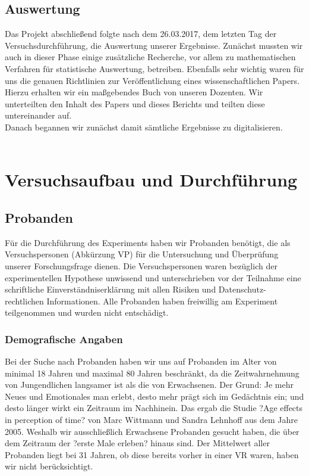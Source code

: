 \documentclass{Bericht}
\begin{document}
	\subsection{Auswertung} %
	
		Das Projekt abschließend folgte nach dem 26.03.2017, dem letzten Tag der Versuchsdurchführung, die Auswertung unserer Ergebnisse.
		Zunächst mussten wir auch in dieser Phase einige zusätzliche Recherche, vor allem zu mathematischen Verfahren für statistische Auswertung, betreiben. Ebenfalls sehr wichtig waren für uns die genauen Richtlinien zur Veröffentlichung eines wissenschaftlichen Papers. Hierzu erhalten wir ein maßgebendes Buch von unseren Dozenten. Wir unterteilten den Inhalt des Papers und dieses Berichts und teilten diese untereinander auf.\\
		Danach begannen wir zunächst damit sämtliche Ergebnisse zu digitalisieren.\\
\\

\section{Versuchsaufbau und Durchführung}
	\subsection{Probanden}
Für die Durchführung des Experiments haben wir Probanden benötigt, die als Versuchspersonen (Abkürzung VP) für die Untersuchung und Überprüfung unserer Forschungsfrage dienen. 
Die Versuchspersonen waren bezüglich der experimentellen Hypothese unwissend und unterschrieben vor der Teilnahme eine schriftliche Einverständniserklärung mit allen Risiken und Datenschutz-rechtlichen Informationen. Alle Probanden haben freiwillig am Experiment teilgenommen und wurden nicht entschädigt. 
\par

\subsubsection{Demografische Angaben}

Bei der Suche nach Probanden haben wir uns auf Probanden im Alter von minimal 18 Jahren und maximal 80 Jahren beschränkt, da die Zeitwahrnehmung von Jungendlichen langsamer ist als die von Erwachsenen. Der Grund: Je mehr Neues und Emotionales man erlebt, desto mehr prägt sich im Gedächtnis ein; und desto länger wirkt ein Zeitraum im Nachhinein. Das ergab die Studie ?Age effects in perception of time? von Marc Wittmann und Sandra Lehnhoff aus dem Jahre 2005. Weshalb wir ausschließlich Erwachsene Probanden gesucht haben, die über dem Zeitraum der ?erste Male erleben? hinaus sind. Der Mittelwert aller Probanden liegt bei 31 Jahren, ob diese bereits vorher in einer VR waren, haben wir nicht berücksichtigt. \\
\end{document}
